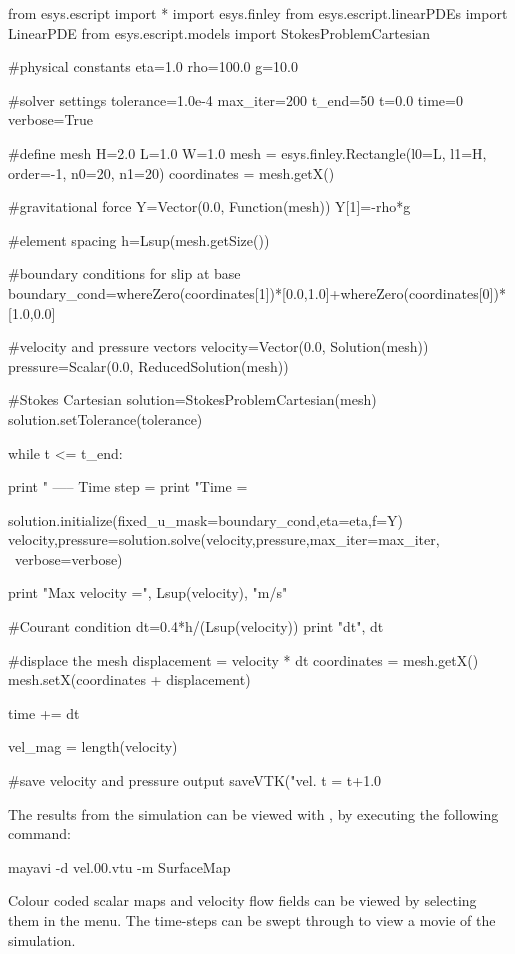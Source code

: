\begin{python}
from esys.escript import *
import esys.finley
from esys.escript.linearPDEs import LinearPDE
from esys.escript.models import StokesProblemCartesian

#physical constants
eta=1.0
rho=100.0
g=10.0 

#solver settings
tolerance=1.0e-4
max_iter=200
t_end=50
t=0.0
time=0
verbose=True

#define mesh 
H=2.0
L=1.0
W=1.0
mesh = esys.finley.Rectangle(l0=L, l1=H, order=-1, n0=20, n1=20)
coordinates = mesh.getX()

#gravitational force
Y=Vector(0.0, Function(mesh))
Y[1]=-rho*g

#element spacing
h=Lsup(mesh.getSize())

#boundary conditions for slip at base
boundary_cond=whereZero(coordinates[1])*[0.0,1.0]+whereZero(coordinates[0])*[1.0,0.0]

#velocity and pressure vectors
velocity=Vector(0.0, Solution(mesh))
pressure=Scalar(0.0, ReducedSolution(mesh))

#Stokes Cartesian
solution=StokesProblemCartesian(mesh)
solution.setTolerance(tolerance)

while t <= t_end:

  print " ----- Time step = %
  print "Time = %
 
  solution.initialize(fixed_u_mask=boundary_cond,eta=eta,f=Y)
  velocity,pressure=solution.solve(velocity,pressure,max_iter=max_iter, \
  verbose=verbose)
  
  print "Max velocity =", Lsup(velocity), "m/s"
  
  #Courant condition
  dt=0.4*h/(Lsup(velocity))
  print "dt", dt 
  
  #displace the mesh
  displacement = velocity * dt
  coordinates = mesh.getX()
  mesh.setX(coordinates + displacement)  
  
  time += dt
  
  vel_mag = length(velocity)

  #save velocity and pressure output
  saveVTK("vel.%
  t = t+1.0

\end{python}
%
The results from the simulation can be viewed with \mayavi, by executing the following command:
%
\begin{python}
mayavi -d vel.00.vtu -m SurfaceMap
\end{python}
%
Colour coded scalar maps and velocity flow fields can be viewed by selecting them in the menu. The time-steps can be swept through to view a movie of the simulation.
